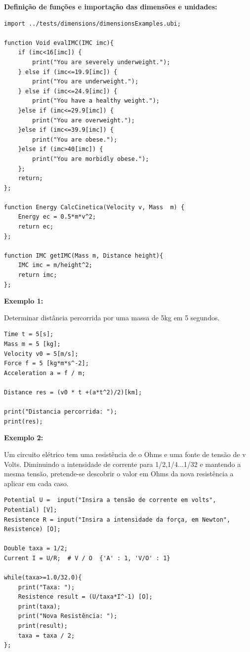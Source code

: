 \documentclass[10pt,portuguese]{article}
\begin{document}
\par \textbf{Definição de funções e importação das dimensões e unidades:}

\begin{lstlisting}[numbers=none]
import ../tests/dimensions/dimensionsExamples.ubi;

function Void evalIMC(IMC imc){
    if (imc<16[imc]) {
        print("You are severely underweight.");
    } else if (imc<=19.9[imc]) {
        print("You are underweight.");
    } else if (imc<=24.9[imc]) {
        print("You have a healthy weight.");
    }else if (imc<=29.9[imc]) {
        print("You are overweight.");
    }else if (imc<=39.9[imc]) {
        print("You are obese.");
    }else if (imc>40[imc]) {
        print("You are morbidly obese.");
    };
    return;
};

function Energy CalcCinetica(Velocity v, Mass  m) {
    Energy ec = 0.5*m*v^2;
    return ec;
};

function IMC getIMC(Mass m, Distance height){
    IMC imc = m/height^2;
    return imc;
};
\end{lstlisting}

\par \textbf{Exemplo 1:}

\par Determinar distância percorrida por uma massa de 5kg em 5 segundos.

\begin{lstlisting}[numbers=none]
Time t = 5[s];            
Mass m = 5 [kg];
Velocity v0 = 5[m/s];     
Force f = 5 [kg*m*s^-2];
Acceleration a = f / m;

Distance res = (v0 * t +(a*t^2)/2)[km];

print("Distancia percorrida: ");
print(res);
\end{lstlisting}

\clearpage

\par \textbf{Exemplo 2:}

\par Um circuito elétrico tem uma resistência de o Ohms e uma fonte de tensão de v Volts. Diminuindo a intensidade de corrente para 1/2,1/4...1/32 e mantendo a mesma tensão, pretende-se descobrir o valor em Ohms da nova resistência a aplicar em cada caso.

\begin{lstlisting}[numbers=none]
Potential U =  input("Insira a tensão de corrente em volts", Potential) [V];
Resistence R = input("Insira a intensidade da força, em Newton", Resistence) [O];

Double taxa = 1/2;
Current I = U/R;  # V / O  {'A' : 1, 'V/O' : 1}

while(taxa>=1.0/32.0){
    print("Taxa: ");
    Resistence result = (U/taxa*I^-1) [O];
    print(taxa);
    print("Nova Resistência: ");
    print(result);
    taxa = taxa / 2;
};
\end{lstlisting}
\end{document}
